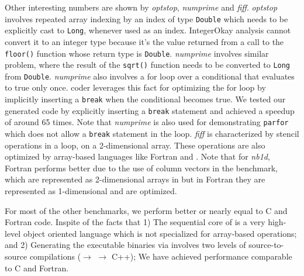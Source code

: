 Other interesting numbers are shown by \emph{optstop}, \emph{numprime} and
\emph{fiff}.
\emph{optstop} involves repeated array indexing by an index of type
\texttt{Double} which needs to be explicitly cast to \texttt{Long}, whenever
used as an index. IntegerOkay analysis cannot convert it to an integer type
because it's the value returned from a call to the \texttt{floor()} function
whose return type is \texttt{Double}. \emph{numprime} involves similar problem,
where the result of the \texttt{sqrt()} function needs to be converted to
\texttt{Long} from \texttt{Double}. \emph{numprime} also involves a for loop
over a conditional that evaluates to true only once. \matlab coder leverages
this fact for optimizing the for loop by implicitly inserting a \texttt{break}
when the conditional becomes true. We tested our generated \xten code by
explicitly inserting a \texttt{break} statement and achieved a speedup of around
65 times. Note that \emph{numprime} is also used for demonstrating
\texttt{parfor} which does not allow a \texttt{break} statement in the loop.
\emph{fiff} is characterized by stencil operations in a loop,
 on a 2-dimensional array. These operations are also optimized by array-based
languages like Fortran and \matlab.  
Note that for \emph{nb1d}, Fortran performs better due to the use of column
vectors in the benchmark, which are represented as 2-dimensional arrays in \xten
but in Fortran they are represented as 1-dimensional and are optimized.

For most of the other benchmarks, we perform better or nearly equal to C and
Fortran code. Inspite of the facts that 1) The sequential core of \xten is a
very high-level object oriented language which is not specialized for
array-based operations; and 2) Generating the executable binaries via \mixten
involves two levels of source-to-source compilations (\matlab $\rightarrow$
\xten $\rightarrow$ C++); We have achieved performance comparable to C and
Fortran.  
       

